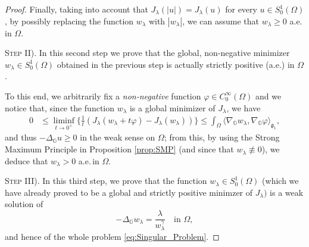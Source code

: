 \documentclass[11pt]{amsart}
\numberwithin{equation}{section} %
\theoremstyle{definition}
\begin{document}
\begin{proof}
			 Finally, taking into account that $J_\lambda(|u|)=J_\lambda(u)$ for every $u\in S_0^1(\Omega)$,
			 by possibly replacing the function $w_\lambda$ with $|w_\lambda|$, we can assume that
			 $w_\lambda \geq 0$ a.e.\,in $\Omega$.
			 \medskip
			 
			 \textsc{Step II).} In this second step we prove that the global, non-negative
			 minimizer $w_\lambda\in S_0^1(\Omega)$ 
			 obtained in the previous step is actually strictly positive (a.e.) in $\Omega$.
			 
			 To this end, we arbitrarily fix a \emph{non-negative} function $\varphi\in C_0^\infty(\Omega)$
			 and we notice that, since 
			 the function $w_\lambda$ is a global minimizer of $J_\lambda$, we have
			 \begin{align*}
			  0 & \leq \liminf_{t\to 0^+}\Big\{
			  \frac{1}{t}(J_\lambda(w_\lambda+t\varphi)-J_\lambda(w_\lambda))\Big\} 
			  \leq\int_\Omega\langle\nabla_\mathbb{G}w_\lambda,
			  \nabla_\mathbb{G}\varphi\rangle_{\mathfrak{g}_{1}},
			 \end{align*}
			 and thus $-\Delta_\mathbb{G}u\geq 0$ in the weak sense on $\Omega$;
			 from this, by using the Strong Maximum Principle in Proposition 
			 \ref{prop:SMP} (and since that $w_\lambda\not\equiv 0$), we deduce that 
			 $w_\lambda > 0$ a.e.\,in $\Omega$.
			 \medskip
			 
			 \textsc{Step III).} In this third step, we prove that the function  $w_\lambda\in S_0^1(\Omega)$
			 (which we have already proved to be a glo\-bal and strictly positive minimzer of
			 $J_\lambda)$ is a weak solution of 
			 \begin{equation} \label{eq:PDEpurelysingular}
			  -\Delta_\mathbb{G}w_\lambda = \frac{\lambda}{w_{\lambda}^\gamma}\quad\text{in $\Omega$},
			 \end{equation}
			 and hence of the whole problem \eqref{eq:Singular_Problem}.
			 

\end{proof}
\end{document}
